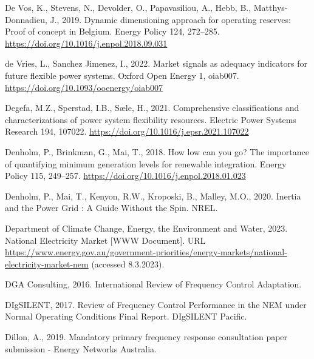 \documentclass[12pt,a4paper,]{report}
\newlength{\cslhangindent}
\newenvironment{CSLReferences}[2] %
 {%
  \setlength{\parindent}{0pt}
  \ifodd #1 \everypar{\setlength{\hangindent}{\cslhangindent}}\ignorespaces\fi
  \ifnum #2 > 0
  \setlength{\parskip}{#2\baselineskip}
  \fi
 }%
 {}
\begin{document}
\begin{CSLReferences}{1}{0}
\leavevmode{}%
De Vos, K., Stevens, N., Devolder, O., Papavasiliou, A., Hebb, B.,
Matthys-Donnadieu, J., 2019. Dynamic dimensioning approach for operating
reserves: {Proof} of concept in {Belgium}. Energy Policy 124, 272--285.
\url{https://doi.org/10.1016/j.enpol.2018.09.031}

\leavevmode{}%
de Vries, L., Sanchez Jimenez, I., 2022. Market signals as adequacy
indicators for future flexible power systems. Oxford Open Energy 1,
oiab007. \url{https://doi.org/10.1093/ooenergy/oiab007}

\leavevmode{}%
Degefa, M.Z., Sperstad, I.B., Sæle, H., 2021. Comprehensive
classifications and characterizations of power system flexibility
resources. Electric Power Systems Research 194, 107022.
\url{https://doi.org/10.1016/j.epsr.2021.107022}

\leavevmode{}%
Denholm, P., Brinkman, G., Mai, T., 2018. How low can you go? {The}
importance of quantifying minimum generation levels for renewable
integration. Energy Policy 115, 249--257.
\url{https://doi.org/10.1016/j.enpol.2018.01.023}

\leavevmode{}%
Denholm, P., Mai, T., Kenyon, R.W., Kroposki, B., Malley, M.O., 2020.
Inertia and the {Power Grid} : {A Guide Without} the {Spin}. NREL.

\leavevmode{}%
Department of Climate Change, Energy, the Environment and Water, 2023.
National {Electricity Market} {[}WWW Document{]}. URL
\url{https://www.energy.gov.au/government-priorities/energy-markets/national-electricity-market-nem}
(accessed 8.3.2023).

\leavevmode{}%
DGA Consulting, 2016. International {Review} of {Frequency Control
Adaptation}.

\leavevmode{}%
DIgSILENT, 2017. Review of {Frequency Control Performance} in the {NEM}
under {Normal Operating Conditions Final Report}. DIgSILENT Pacific.

\leavevmode{}%
Dillon, A., 2019. Mandatory primary frequency response consultation
paper submission - {Energy Networks Australia}.


\end{CSLReferences}
\end{document}
